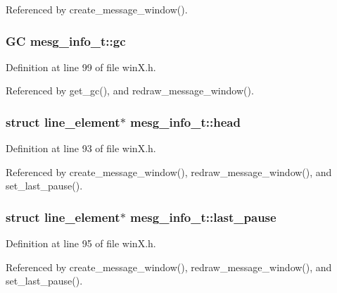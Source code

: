 Referenced by create\+\_\+message\+\_\+window().

\hypertarget{structmesg__info__t_ace94c43075742d8ba4d9109669ba078c}{
\subsubsection[{gc}]{\setlength{\rightskip}{0pt plus 5cm}G\+C mesg\+\_\+info\+\_\+t\+::gc}}\label{structmesg__info__t_ace94c43075742d8ba4d9109669ba078c}


Definition at line 99 of file win\+X.\+h.



Referenced by get\+\_\+gc(), and redraw\+\_\+message\+\_\+window().

\hypertarget{structmesg__info__t_a9ec2627ed09c84d0871571ab1b004961}{
\subsubsection[{head}]{\setlength{\rightskip}{0pt plus 5cm}struct {\bf line\+\_\+element}$\ast$ mesg\+\_\+info\+\_\+t\+::head}}\label{structmesg__info__t_a9ec2627ed09c84d0871571ab1b004961}


Definition at line 93 of file win\+X.\+h.



Referenced by create\+\_\+message\+\_\+window(), redraw\+\_\+message\+\_\+window(), and set\+\_\+last\+\_\+pause().

\hypertarget{structmesg__info__t_a45ba0dcdbeb9c6492d19f4712b003254}{
\subsubsection[{last\+\_\+pause}]{\setlength{\rightskip}{0pt plus 5cm}struct {\bf line\+\_\+element}$\ast$ mesg\+\_\+info\+\_\+t\+::last\+\_\+pause}}\label{structmesg__info__t_a45ba0dcdbeb9c6492d19f4712b003254}


Definition at line 95 of file win\+X.\+h.



Referenced by create\+\_\+message\+\_\+window(), redraw\+\_\+message\+\_\+window(), and set\+\_\+last\+\_\+pause().

